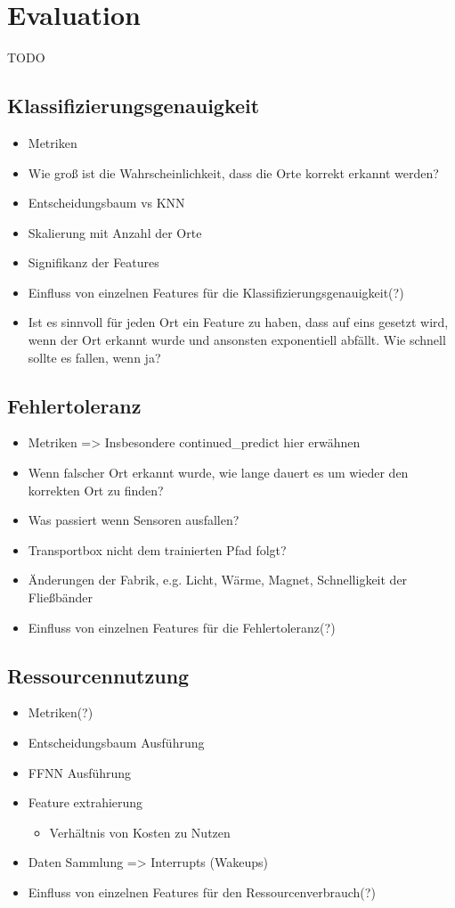 \chapter{Evaluation}
TODO

\section{Klassifizierungsgenauigkeit}
\begin{itemize}
    \item Metriken
    \item Wie groß ist die Wahrscheinlichkeit, dass die Orte korrekt erkannt werden?
    \item Entscheidungsbaum vs KNN
    \item Skalierung mit Anzahl der Orte
    \item Signifikanz der Features
    \item Einfluss von einzelnen Features für die Klassifizierungsgenauigkeit(?)
    \item Ist es sinnvoll für jeden Ort ein Feature zu haben, dass auf eins gesetzt wird, wenn der Ort erkannt wurde und ansonsten exponentiell abfällt. Wie schnell sollte es fallen, wenn ja?
\end{itemize}

\section{Fehlertoleranz}
\begin{itemize}
    \item Metriken => Insbesondere continued\_predict hier erwähnen
    \item Wenn falscher Ort erkannt wurde, wie lange dauert es um wieder den korrekten Ort zu finden?
    \item Was passiert wenn Sensoren ausfallen?
    \item Transportbox nicht dem trainierten Pfad folgt?
    \item Änderungen der Fabrik, e.g. Licht, Wärme, Magnet, Schnelligkeit der Fließbänder
    \item Einfluss von einzelnen Features für die Fehlertoleranz(?)
\end{itemize}

\section{Ressourcennutzung}
\begin{itemize}
    \item Metriken(?)
    \item Entscheidungsbaum Ausführung
    \item FFNN Ausführung
    \item Feature extrahierung
    \begin{itemize}
        \item Verhältnis von Kosten zu Nutzen
    \end{itemize}
    \item Daten Sammlung => Interrupts (Wakeups)
    \item Einfluss von einzelnen Features für den Ressourcenverbrauch(?)
\end{itemize}
